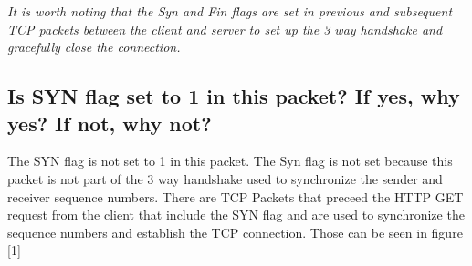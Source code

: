 \documentclass{assignment-x}
\begin{document}
\textit{It is worth noting that the Syn and Fin flags are set in previous and subsequent TCP  packets between the client and server to set up the 3 way handshake and gracefully close the connection.}

\subsection{Is SYN flag set to 1 in this packet? If yes, why yes? If not, why not?}
The SYN flag is not set to 1 in this packet. The Syn flag is not set because this packet is not part of the 3 way handshake used to synchronize the sender and receiver sequence numbers. There are TCP Packets that preceed the HTTP GET request from the client that include the SYN flag and are used to synchronize the sequence numbers and establish the TCP connection. Those can be seen in figure 
[1\linewidth]
\end{document}
